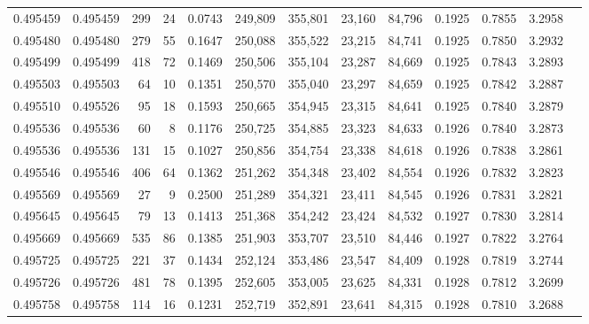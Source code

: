 \begin{tabular}{rrrrrrrrrrrrr}
0.495459 & 0.495459 &   299 &    24 &                                     0.0743 & 249,809 & 355,801 &  23,160 &  84,796 & 0.1925 & 0.7855 & 3.2958 \\
0.495480 & 0.495480 &   279 &    55 &                                     0.1647 & 250,088 & 355,522 &  23,215 &  84,741 & 0.1925 & 0.7850 & 3.2932 \\
0.495499 & 0.495499 &   418 &    72 &                                     0.1469 & 250,506 & 355,104 &  23,287 &  84,669 & 0.1925 & 0.7843 & 3.2893 \\
0.495503 & 0.495503 &    64 &    10 &                                     0.1351 & 250,570 & 355,040 &  23,297 &  84,659 & 0.1925 & 0.7842 & 3.2887 \\
0.495510 & 0.495526 &    95 &    18 &                                     0.1593 & 250,665 & 354,945 &  23,315 &  84,641 & 0.1925 & 0.7840 & 3.2879 \\
0.495536 & 0.495536 &    60 &     8 &                                     0.1176 & 250,725 & 354,885 &  23,323 &  84,633 & 0.1926 & 0.7840 & 3.2873 \\
0.495536 & 0.495536 &   131 &    15 &                                     0.1027 & 250,856 & 354,754 &  23,338 &  84,618 & 0.1926 & 0.7838 & 3.2861 \\
0.495546 & 0.495546 &   406 &    64 &                                     0.1362 & 251,262 & 354,348 &  23,402 &  84,554 & 0.1926 & 0.7832 & 3.2823 \\
0.495569 & 0.495569 &    27 &     9 &                                     0.2500 & 251,289 & 354,321 &  23,411 &  84,545 & 0.1926 & 0.7831 & 3.2821 \\
0.495645 & 0.495645 &    79 &    13 &                                     0.1413 & 251,368 & 354,242 &  23,424 &  84,532 & 0.1927 & 0.7830 & 3.2814 \\
0.495669 & 0.495669 &   535 &    86 &                                     0.1385 & 251,903 & 353,707 &  23,510 &  84,446 & 0.1927 & 0.7822 & 3.2764 \\
0.495725 & 0.495725 &   221 &    37 &                                     0.1434 & 252,124 & 353,486 &  23,547 &  84,409 & 0.1928 & 0.7819 & 3.2744 \\
0.495726 & 0.495726 &   481 &    78 &                                     0.1395 & 252,605 & 353,005 &  23,625 &  84,331 & 0.1928 & 0.7812 & 3.2699 \\
0.495758 & 0.495758 &   114 &    16 &                                     0.1231 & 252,719 & 352,891 &  23,641 &  84,315 & 0.1928 & 0.7810 & 3.2688 \\

\end{tabular}

